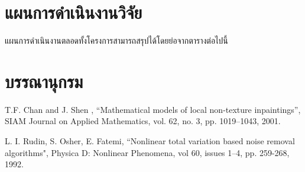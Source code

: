 \documentclass[hidelinks, a4paper,12pt]{article}
\numberwithin{equation}{section}							%
\numberwithin{equation}{section}
\begin{document}
{	
	
\section{แผนการดำเนินงานวิจัย}
\hspace{1cm} แผนการดำเนินงานตลอดทั้งโครงการสามารถสรุปได้โดยย่อจากตารางต่อไปนี้
\begin{center}
\end{center}




\section{บรรณานุกรม}

\renewcommand{\section}[2]{} %
\begin{thebibliography}{}
	
	T.F. Chan and J. Shen , “Mathematical models of local non-texture inpaintings”, SIAM Journal on Applied Mathematics, vol. 62, no. 3, pp. 1019–1043, 2001. 
	
	L. I. Rudin, S. Osher, E. Fatemi, “Nonlinear total variation based noise removal algorithms", Physica D: Nonlinear Phenomena, vol 60, issues 1–4, pp. 259-268, 1992. 
	

\end{thebibliography}}
\end{document}

